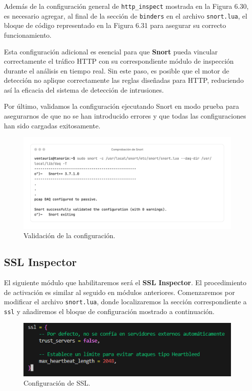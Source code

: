 \documentclass[11pt,a4paper,twoside]{report}
\begin{document}

Además de la configuración general de \texttt{http\_inspect} mostrada en la Figura 6.30, es necesario agregar, al final de la sección de \texttt{binders} en el archivo \texttt{snort.lua}, el bloque de código representado en la Figura 6.31 para asegurar su correcto funcionamiento.
\newline

Esta configuración adicional es esencial para que \textbf{Snort} pueda vincular correctamente el tráfico HTTP con su correspondiente módulo de inspección durante el análisis en tiempo real. Sin este paso, es posible que el motor de detección no aplique correctamente las reglas diseñadas para HTTP, reduciendo así la eficacia del sistema de detección de intrusiones.
\newline

Por último, validamos la configuración ejecutando Snort en modo prueba para asegurarnos de que no se han introducido errores y que todas las configuraciones han sido cargadas exitosamente.

\begin{figure}[H]
	\centering
	\includegraphics[scale=0.1]{http_inspect/6-6.png}
	\caption{Validación de la configuración.}
\end{figure}


\subsection{SSL Inspector}

El siguiente módulo que habilitaremos será el \textbf{SSL Inspector}. El procedimiento de activación es similar al seguido en módulos anteriores. Comenzaremos por modificar el archivo \texttt{snort.lua}, donde localizaremos la sección correspondiente a \texttt{ssl} y añadiremos el bloque de configuración mostrado a continuación.

\begin{figure}[H]
	\centering
	\includegraphics[scale=0.8]{ssl_inspect/8.png}
	\caption{Configuración de SSL.}
\end{figure}
\end{document}
